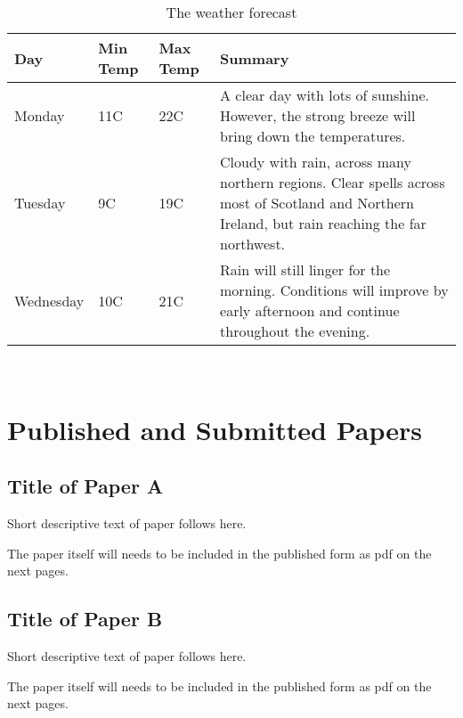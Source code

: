\documentclass[11pt,openright]{book} %
\begin{document}
\begin{table}[!ht]
  \centering
    \begin{tabular}{ | l | l | l | p{5cm} |}
    \hline
    Day & Min Temp & Max Temp & Summary \\ \hline
    Monday & 11C & 22C & A clear day with lots of sunshine.
    However, the strong breeze will bring down the temperatures. \\ \hline
    Tuesday & 9C & 19C & Cloudy with rain, across many northern regions. Clear spells
    across most of Scotland and Northern Ireland,
    but rain reaching the far northwest. \\ \hline
    Wednesday & 10C & 21C & Rain will still linger for the morning.
    Conditions will improve by early afternoon and continue
    throughout the evening. \\
    \hline
    \end{tabular}
  \caption{The weather forecast}
\end{table}

~\nocite{*}

\cleardoublepage
{}



\appendix
\renewcommand{\appendixname}{Paper} %

\part{Published and Submitted Papers}  %
\label{part:papers}


\chapter{Title of Paper A}
\label{paper-a}

Short descriptive text of paper follows here.

The paper itself will needs to be included in the published form as pdf on the next pages.

\chapter{Title of Paper B}
\label{paper-b}
Short descriptive text of paper follows here.

The paper itself will needs to be included in the published form as pdf on the next pages.
\end{document}
